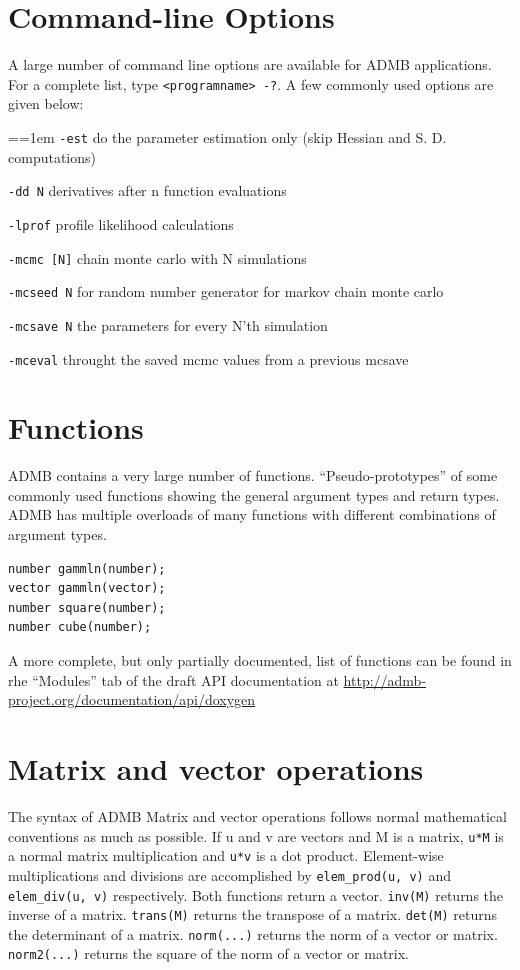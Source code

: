 \section{Command-line Options}
A large number of command line options are available for ADMB
applications. For a complete list, type \verb|<programname> -?|.
A few commonly used options are given below:
\par{\everypar={\hangindent=1em }
\verb|-est| do the parameter estimation only (skip Hessian and S. D.
computations)\par
\verb|-dd N| derivatives after n function evaluations\par
\verb|-lprof| profile likelihood calculations\par
\verb|-mcmc [N]| chain monte carlo with N simulations\par
\verb|-mcseed N| for random number generator for markov chain monte carlo\par
\verb|-mcsave N| the parameters for every N'th simulation\par
\verb|-mceval| throught the saved mcmc values from a previous mcsave\par
}\par

\section{Functions}
ADMB contains a very large number of functions.
``Pseudo-prototypes'' of some commonly used functions
showing the general argument types and return types. ADMB has
multiple overloads of many functions with different combinations of
argument types.

\begin{verbatim}
number gammln(number); 
vector gammln(vector);
number square(number); 
number cube(number); 
\end{verbatim}

A more complete, but only partially documented, list of functions can be found
in rhe ``Modules'' tab of the draft API documentation at
\href {http://admb-project.org/documentation/api/doxygen}
{http://admb-project.org/documentation/api/doxygen}

\section{Matrix and vector operations}
The syntax of ADMB Matrix and vector operations follows normal
mathematical conventions as much as possible. If u and v are
vectors and M is a matrix, \verb|u*M| is a normal matrix
multiplication and \verb|u*v| is a dot product. Element-wise
multiplications and divisions are accomplished by
\verb|elem_prod(u, v)| and \verb|elem_div(u, v)|
respectively. Both functions return a vector.
\verb|inv(M)| returns the inverse of a matrix.
\verb|trans(M)| returns the transpose of a matrix.
\verb|det(M)| returns the determinant of a matrix.
\verb|norm(...)| returns the norm of a vector or matrix.
\verb|norm2(...)| returns the square of the norm of a vector or matrix.

